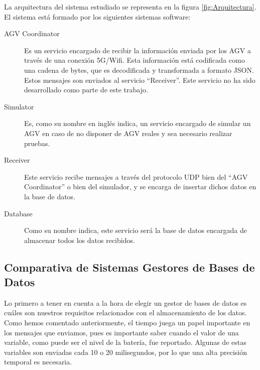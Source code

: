 La arquitectura del sistema estudiado se representa en la figura \ref*{fig:Arquitectura}. El sistema
está formado por los siguientes sistemas software:
\begin{description}
    \item [AGV Coordinator] Es un servicio encargado de recibir la información enviada por los AGV a
        través de una conexión 5G/Wifi. Esta información está codificada como una cadena de bytes, que
        es decodificada y transformada a formato JSON. Estos mensajes son enviados al servicio 
        ``Receiver''. Este servicio no ha sido desarrollado como parte de este trabajo.
    \item [Simulator] Es, como su nombre en inglés indica, un servicio encargado de simular un AGV
        en caso de no disponer de AGV reales y sea necesario realizar pruebas.
    \item [Receiver] Este servicio recibe mensajes a través del protocolo UDP bien del ``AGV Coordinator''
        o bien del simulador, y se encarga de insertar dichos datos en la base de datos.
    \item [Database] Como su nombre indica, este servicio será la base de datos encargada de almacenar
        todos los datos recibidos.
\end{description}


\subsection{Comparativa de Sistemas Gestores de Bases de Datos}

Lo primero a tener en cuenta a la hora de elegir un gestor de bases de datos es cuáles son nuestros
requisitos relacionados con el almacenamiento de los datos. Como hemos comentado anteriormente, el tiempo
juega un papel importante en los mensajes que enviamos, pues es importante saber cuando el valor de
una variable, como puede ser el nivel de la batería, fue reportado. Algunas de estas variables son
enviadas cada 10 o 20 milisegundos, por lo que una alta precisión temporal es necesaria.

